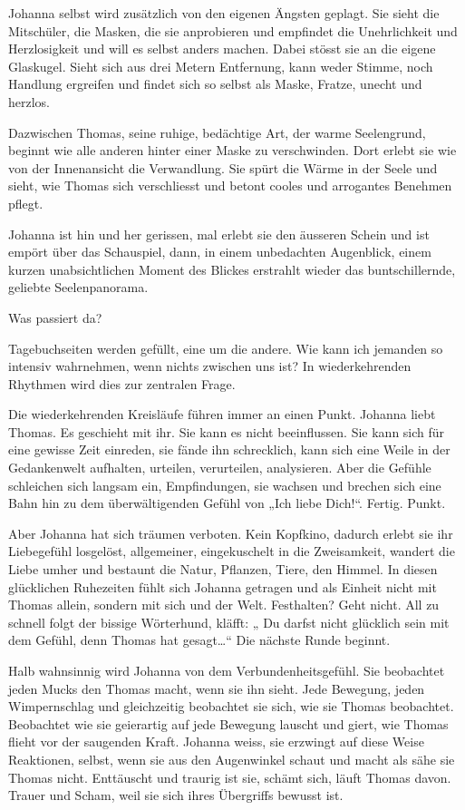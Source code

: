 \documentclass[10pt,titlepage,a5paper]{book}
\begin{document}
Johanna selbst wird zusätzlich von den eigenen Ängsten geplagt. Sie sieht die Mitschüler, die Masken, die sie anprobieren und empfindet die Unehrlichkeit und Herzlosigkeit und will es selbst anders machen. Dabei stösst sie an die eigene Glaskugel. Sieht sich aus drei Metern Entfernung, kann weder Stimme, noch Handlung ergreifen und findet sich so selbst als Maske, Fratze, unecht und herzlos.

Dazwischen Thomas, seine ruhige, bedächtige Art, der warme Seelengrund, beginnt wie alle anderen hinter einer Maske zu verschwinden. Dort erlebt sie wie von der Innenansicht die Verwandlung. Sie spürt die Wärme in der Seele und sieht, wie Thomas sich verschliesst und betont cooles und arrogantes Benehmen pflegt. 

Johanna ist hin und her gerissen, mal erlebt sie den äusseren Schein und ist empört über das Schauspiel, dann, in einem unbedachten Augenblick, einem kurzen unabsichtlichen Moment des Blickes erstrahlt wieder das buntschillernde, geliebte Seelenpanorama. 

Was passiert da?

Tagebuchseiten werden gefüllt, eine um die andere. Wie kann ich jemanden so intensiv wahrnehmen, wenn nichts zwischen uns ist? In wiederkehrenden Rhythmen wird dies zur zentralen Frage. 

Die wiederkehrenden Kreisläufe führen immer an einen Punkt. Johanna liebt Thomas. Es geschieht mit ihr. Sie kann es nicht beeinflussen. Sie kann sich für eine gewisse Zeit einreden, sie fände ihn schrecklich, kann sich eine Weile in der Gedankenwelt  aufhalten, urteilen, verurteilen, analysieren. Aber die Gefühle schleichen sich langsam ein, Empfindungen, sie wachsen und brechen sich  eine Bahn hin zu dem überwältigenden Gefühl von „Ich liebe Dich!“.  Fertig. Punkt.

Aber Johanna hat sich träumen verboten. Kein Kopfkino, dadurch erlebt sie ihr Liebegefühl losgelöst, allgemeiner, eingekuschelt in die Zweisamkeit, wandert die Liebe umher und bestaunt die Natur, Pflanzen, Tiere, den Himmel. In diesen glücklichen Ruhezeiten fühlt sich Johanna getragen und als Einheit nicht mit Thomas allein, sondern mit sich und der Welt. Festhalten? Geht nicht. All zu schnell folgt der bissige Wörterhund, kläfft: „ Du darfst nicht glücklich sein mit dem Gefühl, denn Thomas hat gesagt\dots “ Die nächste Runde beginnt.

Halb wahnsinnig wird Johanna von dem Verbundenheitsgefühl. Sie beobachtet jeden Mucks den Thomas macht, wenn sie ihn sieht. Jede Bewegung, jeden Wimpernschlag und gleichzeitig beobachtet sie sich, wie sie Thomas beobachtet. Beobachtet wie sie geierartig auf jede Bewegung lauscht und giert, wie Thomas flieht vor der saugenden Kraft. Johanna weiss, sie erzwingt auf diese Weise Reaktionen, selbst, wenn sie aus den Augenwinkel schaut und macht als sähe sie Thomas nicht. Enttäuscht und traurig ist sie, schämt sich, läuft Thomas davon. Trauer und Scham, weil sie sich ihres Übergriffs bewusst ist. 
\end{document}
